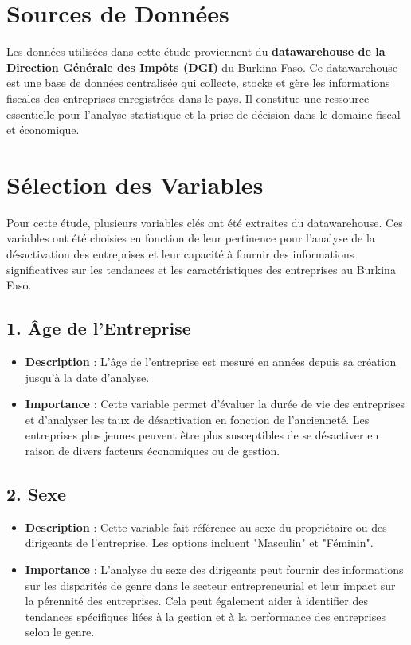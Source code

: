 \documentclass[a4paper,12pt]{report}
\begin{document}
\section{Sources de Données}

Les données utilisées dans cette étude proviennent du \textbf{datawarehouse de la Direction Générale des Impôts (DGI)} du Burkina Faso. Ce datawarehouse est une base de données centralisée qui collecte, stocke et gère les informations fiscales des entreprises enregistrées dans le pays. Il constitue une ressource essentielle pour l’analyse statistique et la prise de décision dans le domaine fiscal et économique.

\section{Sélection des Variables}

Pour cette étude, plusieurs variables clés ont été extraites du datawarehouse. Ces variables ont été choisies en fonction de leur pertinence pour l’analyse de la désactivation des entreprises et leur capacité à fournir des informations significatives sur les tendances et les caractéristiques des entreprises au Burkina Faso.

\subsection{1. Âge de l’Entreprise}
\begin{itemize}
    \item \textbf{Description} : L'âge de l'entreprise est mesuré en années depuis sa création jusqu'à la date d'analyse.
    \item \textbf{Importance} : Cette variable permet d'évaluer la durée de vie des entreprises et d'analyser les taux de désactivation en fonction de l'ancienneté. Les entreprises plus jeunes peuvent être plus susceptibles de se désactiver en raison de divers facteurs économiques ou de gestion.
\end{itemize}

\subsection{2. Sexe}
\begin{itemize}
    \item \textbf{Description} : Cette variable fait référence au sexe du propriétaire ou des dirigeants de l'entreprise. Les options incluent "Masculin" et "Féminin".
    \item \textbf{Importance} : L'analyse du sexe des dirigeants peut fournir des informations sur les disparités de genre dans le secteur entrepreneurial et leur impact sur la pérennité des entreprises. Cela peut également aider à identifier des tendances spécifiques liées à la gestion et à la performance des entreprises selon le genre.
\end{itemize}
\end{document}
